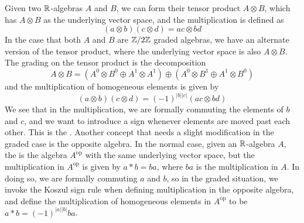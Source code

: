 %
Given two $\mathbb{R}$-algebras $A$ and $B$, we can form their tensor product
$A \otimes B$, which has $A \otimes B$ as the underlying vector space, and the
multiplication is defined as
\[
(a \otimes b)(c \otimes d) = ac \otimes bd
\]
In the case that both $A$ and $B$ are $\mathbb{Z}/2\mathbb{Z}$ graded algebras, we have an alternate
version of the tensor product, where the underlying vector space is also
$A \otimes B$. The grading on the tensor product is the decomposition
\[
A \otimes B = (A^0 \otimes B^0 \oplus A^1 \otimes A^1) \oplus (A^0 \otimes B^1
\oplus A^1 \otimes B^0)
\]
and the multiplication of homogeneous elements is given by
\[
(a \otimes b)(c \otimes d) = (-1)^{|b||c|}(ac \otimes bd)
\]
We see that in the multiplication, we are formally commuting the elements of
$b$ and $c$, and we want to introduce a sign whenever elements are moved past
each other. This is the . Another concept that needs
a slight modification in the graded case is the opposite algebra. In the
normal case, given an $\mathbb{R}$-algebra $A$, the  is
the algebra $A^{\text{op}}$ with the same underlying vector space, but
the multiplication in $A^\text{op}$ is given by $a * b = ba$, where $ba$
is the multiplication in $A$. In doing so, we are formally commuting $a$
and $b$, so in the graded situation, we invoke the Koszul sign rule when
defining multiplication in the opposite algebra, and define the multiplication
of homogeneous elements in $A^{\text{op}}$ to be $a * b = (-1)^{|a||b|} ba$.\\

